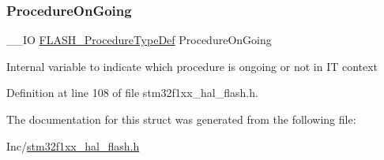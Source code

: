 \subsubsection{\texorpdfstring{Procedure\+On\+Going}{ProcedureOnGoing}}
{\footnotesize\ttfamily \+\_\+\+\_\+\+IO \hyperlink{group___f_l_a_s_h___exported___types_ga2b0268387bc11bcab76be9ce7c43eaaf}{F\+L\+A\+S\+H\+\_\+\+Procedure\+Type\+Def} Procedure\+On\+Going}

Internal variable to indicate which procedure is ongoing or not in IT context 

Definition at line 108 of file stm32f1xx\+\_\+hal\+\_\+flash.\+h.



The documentation for this struct was generated from the following file\+:\begin{DoxyCompactItemize}
\item 
Inc/\hyperlink{stm32f1xx__hal__flash_8h}{stm32f1xx\+\_\+hal\+\_\+flash.\+h}\end{DoxyCompactItemize}
